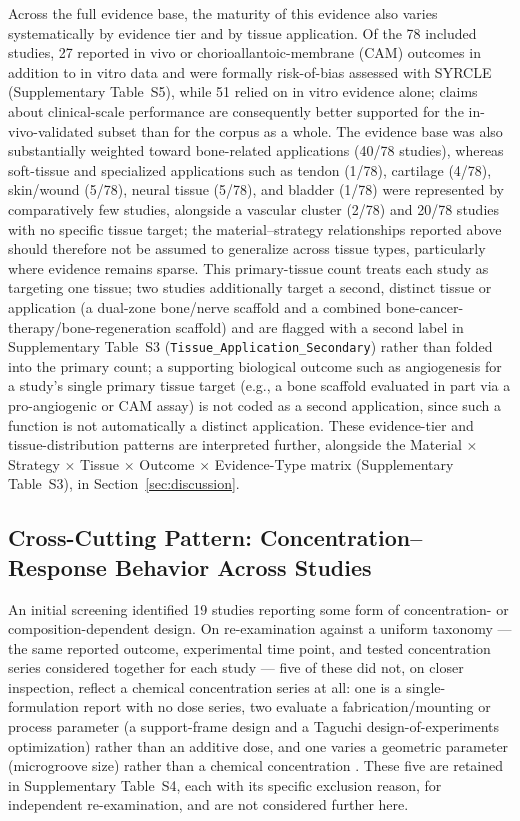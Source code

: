 \documentclass[5p,times,twocolumn]{elsarticle}
\begin{document}
Across the full evidence base, the maturity of this evidence also varies systematically by evidence tier and by tissue application. Of the 78 included studies, 27 reported in vivo or chorioallantoic-membrane (CAM) outcomes in addition to in vitro data and were formally risk-of-bias assessed with SYRCLE (Supplementary Table~S5), while 51 relied on in vitro evidence alone; claims about clinical-scale performance are consequently better supported for the in-vivo-validated subset than for the corpus as a whole. The evidence base was also substantially weighted toward bone-related applications (40/78 studies), whereas soft-tissue and specialized applications such as tendon (1/78), cartilage (4/78), skin/wound (5/78), neural tissue (5/78), and bladder (1/78) were represented by comparatively few studies, alongside a vascular cluster (2/78) and 20/78 studies with no specific tissue target; the material--strategy relationships reported above should therefore not be assumed to generalize across tissue types, particularly where evidence remains sparse. This primary-tissue count treats each study as targeting one tissue; two studies additionally target a second, distinct tissue or application (a dual-zone bone/nerve scaffold and a combined bone-cancer-therapy/bone-regeneration scaffold) and are flagged with a second label in Supplementary Table~S3 (\texttt{Tissue\_Application\_Secondary}) rather than folded into the primary count; a supporting biological outcome such as angiogenesis for a study's single primary tissue target (e.g., a bone scaffold evaluated in part via a pro-angiogenic or CAM assay) is not coded as a second application, since such a function is not automatically a distinct application. These evidence-tier and tissue-distribution patterns are interpreted further, alongside the Material $\times$ Strategy $\times$ Tissue $\times$ Outcome $\times$ Evidence-Type matrix (Supplementary Table~S3), in Section~\ref{sec:discussion}.

\subsection{Cross-Cutting Pattern: Concentration--Response Behavior Across Studies}
\label{sec:pattern}

An initial screening identified 19 studies reporting some form of concentration- or composition-dependent design. On re-examination against a uniform taxonomy --- the same reported outcome, experimental time point, and tested concentration series considered together for each study --- five of these did not, on closer inspection, reflect a chemical concentration series at all: one is a single-formulation report with no dose series, two evaluate a fabrication/mounting or process parameter (a support-frame design and a Taguchi design-of-experiments optimization) rather than an additive dose, and one varies a geometric parameter (microgroove size) rather than a chemical concentration \cite{ref15,ref34,ref39,ref44,ref63}. These five are retained in Supplementary Table~S4, each with its specific exclusion reason, for independent re-examination, and are not considered further here.
\end{document}
